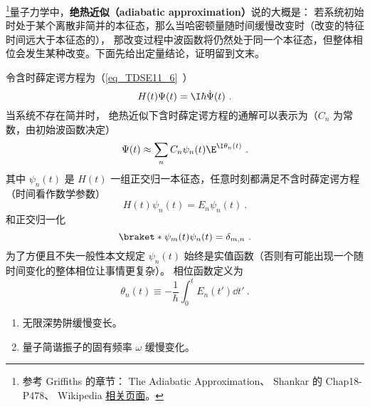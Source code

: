 
\begin{issues}
\issueTODO
\end{issues}


\footnote{参考 Griffiths\cite{GriffE} 的章节： The Adiabatic Approximation、 Shankar\cite{Shankar} 的 Chap18-P478、 Wikipedia \href{https://en.wikipedia.org/wiki/Adiabatic_theorem}{相关页面}。}量子力学中，\textbf{绝热近似（adiabatic approximation）}说的大概是： 若系统初始时处于某个离散非简并的本征态，那么当哈密顿量随时间缓慢改变时（改变的特征时间远大于本征态的）， 那改变过程中波函数将仍然处于同一个本征态，但整体相位会发生某种改变。下面先给出定量结论，证明留到文末。

令含时薛定谔方程为（\autoref{eq_TDSE11_6}~）
\begin{equation}\label{eq_AdiaQM_13}
H(t)\Psi(t) = \I\hbar\dot\Psi(t)~.
\end{equation}
当系统不存在简并时， 绝热近似下含时薛定谔方程的通解可以表示为（$C_n$ 为常数，由初始波函数决定）
\begin{equation}\label{eq_AdiaQM_2}
\Psi(t) \approx \sum_n C_n \psi_n(t) \E^{\I\theta_n(t)}~.
\end{equation}
其中 $\psi_n(t)$ 是 $H(t)$ 一组正交归一本征态，任意时刻都满足不含时薛定谔方程（时间看作数学参数）
\begin{equation}\label{eq_AdiaQM_3}
H(t)\psi_n(t) = E_n\psi_n(t)~.
\end{equation}
和正交归一化
\begin{equation}\label{eq_AdiaQM_6}
\braket*{\psi_m(t)}{\psi_n(t)} = \delta_{m,n}~.
\end{equation}
为了方便且不失一般性本文规定 $\psi_n(t)$ 始终是实值函数（否则有可能出现一个随时间变化的整体相位让事情更复杂）。 相位函数定义为
\begin{equation}\label{eq_AdiaQM_8}
\theta_n(t) \equiv -\frac{1}{\hbar} \int_0^t E_n(t')\dd{t'}~.
\end{equation}

\begin{example}{}
\begin{enumerate}
\item 无限深势阱缓慢变长。
\item 量子简谐振子的固有频率 $\omega$ 缓慢变化。
\end{enumerate}
\end{example}

